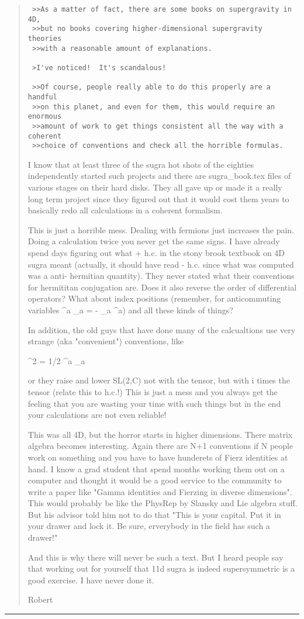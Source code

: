 \begin{quote}
\begin{verbatim}
 >>As a matter of fact, there are some books on supergravity in 4D, 
 >>but no books covering higher-dimensional supergravity theories 
 >>with a reasonable amount of explanations.

 >I've noticed!  It's scandalous! 

 >>Of course, people really able to do this properly are a handful 
 >>on this planet, and even for them, this would require an enormous 
 >>amount of work to get things consistent all the way with a coherent 
 >>choice of conventions and check all the horrible formulas. 
\end{verbatim}
    

I know that at least three of the sugra hot shots of the eighties 
independently started such projects and there are sugra_book.tex files 
of various stages on their hard disks. They all gave up or made it a really 
long term project since they figured out that it would cost them years to 
basically redo all calculations in a coherent formalism.

This is just a horrible mess. Dealing with fermions just increases the pain. 
Doing a calculation twice you never get the same signs. I have already spend 
days figuring out what  + h.c.  in the stony brook textbook on 4D sugra meant 
(actually, it should have read - h.c. since what was computed was a anti-
hermitian quantity). They never stated what their conventions for hermititan 
conjugation are. Does it also reverse the order of differential operators? 
What about index positions (remember, for anticommuting variables 
\psi ^a \phi _a = - \psi _a \phi ^a) and all these kinds of things?

In addition, the old guys that have done many of the calcualtions use very 
strange (aka "convenient") conventions, like

\psi ^{2} = 1/2 \psi ^{a} \psi _{a}


or they raise and lower SL(2,C) not with the \epsilon  tensor, but with i times 
the \epsilon  tensor (relate this to h.c.!) This is just a mess and you always 
get the feeling that you are wasting your time with such things but in the end
your calculations are not even reliable!

This was all 4D, but the horror starts in higher dimensions. There \gamma  matrix
algebra becomes interesting. Again there are N+1 conventions if N people 
work on something and you have to have hunderets of Fierz identities at hand.
I know a grad student that spend months working them out on a computer and 
thought it would be a good service to the community to write a paper like
"Gamma identities and Fierzing in diverse dimensions". This would probably
be like the PhysRep by Slansky and Lie algebra stuff. But his advisor told
him not to do that "This is your capital. Put it in your drawer and lock it.
Be sure, erverybody in the field has such a drawer!"

And this is why there will never be such a text.  But I heard people say that
working out for yourself that 11d sugra is indeed supersymmetric is a good
exercise. I have never done it.

Robert
\end{quote}
 



 \par\noindent\rule{\textwidth}{0.4pt}

